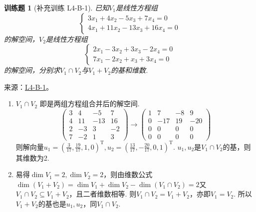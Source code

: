 \documentclass[UTF8,12pt,a4paper,fontset=fandol]{ctexart}
\newtheorem{exercise}{训练题}[section]
\begin{document}
\begin{exercise}[补充训练 L4-B-1]\label{prob:L4-B-1}
已知$V_1$是线性方程组\[\begin{cases}
                3x_1+4x_2-5x_3+7x_4=0 \\
                4x_1+11x_2-13x_3+16x_4=0
            \end{cases}\]
        的解空间，$V_2$是线性方程组\[\begin{cases}
                2x_1-3x_2+3x_3-2x_4=0 \\
                7x_1-2x_2+x_3+3x_4=0
            \end{cases}\]
        的解空间，分别求$V_1 \cap V_2$与$V_1+V_2$的基和维数.
\end{exercise}
\noindent 来源：\href{https://github.com/yhwu-is/Linear-Algebra-Left-Undone/blob/new/%E8%AE%B2%E4%B9%89/%E4%B8%93%E9%A2%98/4%20%E7%BA%BF%E6%80%A7%E7%A9%BA%E9%97%B4%E7%9A%84%E8%BF%90%E7%AE%97.tex}{L4-B-1}。
\begin{solve}
\begin{enumerate}
                \item $V_1\cap V_2$ 即是两组方程组合并后的解空间.
                      \[\begin{pmatrix}
                              3 & 4  & -5  & 7  \\
                              4 & 11 & -13 & 16 \\
                              2 & -3 & 3   & -2 \\
                              7 & -2 & 1   & 3
                          \end{pmatrix}\rightarrow
                          \begin{pmatrix}1 & 7   & -8 & 9   \\
                 0 & -17 & 19 & -20 \\
                 0 & 0   & 0  & 0   \\
                 0 & 0   & 0  & 0
                          \end{pmatrix}\]
                      则解向量$u_1=\left(\frac {3}{17},\frac{19}{17},1,0\right)^\mathrm{T},u_2=\left(\frac{13}{17},-\frac{20}{17},0,1\right)^\mathrm{T}$. $u_1,u_2$是$V_1\cap V_2$的基，则其维数为2.

                \item 易得$\dim V_1=2,\dim V_2=2$，则由维数公式$\dim (V_1+V_2)=\dim V_1+\dim V_2-\dim (V_1\cap V_2)= 2$又$V_1\cap V_2\subseteq V_1+V_2$，且二者维数相等. 则$V_1\cap V_2=V_1+V_2$，亦即$V_1=V_2$. 所以$V_1+V_2$的基也是$u_1,u_2$，同$V_1\cap V_2$.
            \end{enumerate}
\end{solve}
\end{document}
